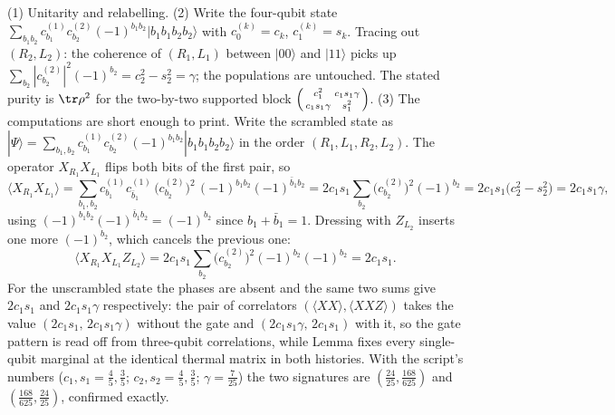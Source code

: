 (1) Unitarity and relabelling. (2) Write the four-qubit state $\sum_{b_1 b_2} c^{(1)}_{b_1} c^{(2)}_{b_2} (-1)^{b_1 b_2} |b_1 b_1 b_2 b_2\rangle$ with $c^{(k)}_0 = c_k$, $c^{(k)}_1 = s_k$. Tracing out $(R_2, L_2)$: the coherence of $(R_1, L_1)$ between $|00\rangle$ and $|11\rangle$ picks up $\sum_{b_2} |c^{(2)}_{b_2}|^2 (-1)^{b_2} = c_2^2 - s_2^2 = \gamma$; the populations are untouched. The stated purity is $\tr \rho^2$ for the two-by-two supported block $\begin{psmallmatrix} c_1^2 & c_1 s_1 \gamma \\ c_1 s_1 \gamma & s_1^2 \end{psmallmatrix}$. (3) The computations are short enough to print. Write the scrambled state as $|\Psi\rangle = \sum_{b_1, b_2} c^{(1)}_{b_1} c^{(2)}_{b_2} (-1)^{b_1 b_2} |b_1 b_1 b_2 b_2\rangle$ in the order $(R_1, L_1, R_2, L_2)$. The operator $X_{R_1}X_{L_1}$ flips both bits of the first pair, so
\[
\langle X_{R_1}X_{L_1}\rangle
= \sum_{b_1, b_2} c^{(1)}_{b_1} c^{(1)}_{\bar b_1}\, \bigl(c^{(2)}_{b_2}\bigr)^2\, (-1)^{b_1 b_2}(-1)^{\bar b_1 b_2}
= 2 c_1 s_1 \sum_{b_2} \bigl(c^{(2)}_{b_2}\bigr)^2 (-1)^{b_2}
= 2 c_1 s_1 \bigl(c_2^2 - s_2^2\bigr) = 2 c_1 s_1 \gamma ,
\]
using $(-1)^{b_1 b_2}(-1)^{\bar b_1 b_2} = (-1)^{b_2}$ since $b_1 + \bar b_1 = 1$. Dressing with $Z_{L_2}$ inserts one more $(-1)^{b_2}$, which cancels the previous one:
\[
\langle X_{R_1}X_{L_1} Z_{L_2}\rangle
= 2 c_1 s_1 \sum_{b_2} \bigl(c^{(2)}_{b_2}\bigr)^2 (-1)^{b_2}(-1)^{b_2}
= 2 c_1 s_1 .
\]
For the unscrambled state the phases are absent and the same two sums give $2 c_1 s_1$ and $2 c_1 s_1 \gamma$ respectively: the pair of correlators $(\langle XX\rangle, \langle XXZ\rangle)$ takes the value $(2c_1s_1,\, 2c_1s_1\gamma)$ without the gate and $(2c_1s_1\gamma,\, 2c_1s_1)$ with it, so the gate pattern is read off from three-qubit correlations, while Lemma  fixes every single-qubit marginal at the identical thermal matrix in both histories. With the script's numbers ($c_1, s_1 = \tfrac45, \tfrac35$; $c_2, s_2 = \tfrac45, \tfrac35$; $\gamma = \tfrac{7}{25}$) the two signatures are $(\tfrac{24}{25}, \tfrac{168}{625})$ and $(\tfrac{168}{625}, \tfrac{24}{25})$, confirmed exactly.
